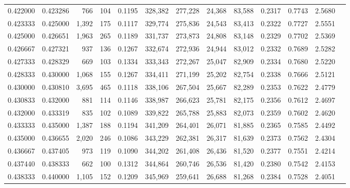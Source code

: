 \begin{tabular}{rrrrrrrrrrrrr}
0.422000 & 0.423286 &   766 & 104 &                                     0.1195 & 328,382 & 277,228 &  24,368 &  83,588 & 0.2317 & 0.7743 & 2.5680 \\
0.423333 & 0.425000 & 1,392 & 175 &                                     0.1117 & 329,774 & 275,836 &  24,543 &  83,413 & 0.2322 & 0.7727 & 2.5551 \\
0.425000 & 0.426651 & 1,963 & 265 &                                     0.1189 & 331,737 & 273,873 &  24,808 &  83,148 & 0.2329 & 0.7702 & 2.5369 \\
0.426667 & 0.427321 &   937 & 136 &                                     0.1267 & 332,674 & 272,936 &  24,944 &  83,012 & 0.2332 & 0.7689 & 2.5282 \\
0.427333 & 0.428329 &   669 & 103 &                                     0.1334 & 333,343 & 272,267 &  25,047 &  82,909 & 0.2334 & 0.7680 & 2.5220 \\
0.428333 & 0.430000 & 1,068 & 155 &                                     0.1267 & 334,411 & 271,199 &  25,202 &  82,754 & 0.2338 & 0.7666 & 2.5121 \\
0.430000 & 0.430810 & 3,695 & 465 &                                     0.1118 & 338,106 & 267,504 &  25,667 &  82,289 & 0.2353 & 0.7622 & 2.4779 \\
0.430833 & 0.432000 &   881 & 114 &                                     0.1146 & 338,987 & 266,623 &  25,781 &  82,175 & 0.2356 & 0.7612 & 2.4697 \\
0.432000 & 0.433319 &   835 & 102 &                                     0.1089 & 339,822 & 265,788 &  25,883 &  82,073 & 0.2359 & 0.7602 & 2.4620 \\
0.433333 & 0.435000 & 1,387 & 188 &                                     0.1194 & 341,209 & 264,401 &  26,071 &  81,885 & 0.2365 & 0.7585 & 2.4492 \\
0.435000 & 0.436655 & 2,020 & 246 &                                     0.1086 & 343,229 & 262,381 &  26,317 &  81,639 & 0.2373 & 0.7562 & 2.4304 \\
0.436667 & 0.437405 &   973 & 119 &                                     0.1090 & 344,202 & 261,408 &  26,436 &  81,520 & 0.2377 & 0.7551 & 2.4214 \\
0.437440 & 0.438333 &   662 & 100 &                                     0.1312 & 344,864 & 260,746 &  26,536 &  81,420 & 0.2380 & 0.7542 & 2.4153 \\
0.438333 & 0.440000 & 1,105 & 152 &                                     0.1209 & 345,969 & 259,641 &  26,688 &  81,268 & 0.2384 & 0.7528 & 2.4051 \\

\end{tabular}
